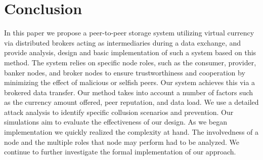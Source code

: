 \documentclass[%
				10pt,
        final,
        notitlepage,
        narroweqnarray,
        inline,
        twoside,
        ]{ieee}
\begin{document}
\section{Conclusion}
In this paper we propose a peer-to-peer storage system utilizing virtual currency via distributed brokers acting as intermediaries during a data exchange, and provide analysis, design and basic implementation of such a system based on this method.  The system relies on specific node roles, such as the consumer, provider, banker nodes, and broker nodes to ensure trustworthiness and cooperation by minimizing the effect of malicious or selfish peers.  Our system achieves this via a brokered data transfer.  Our method takes into account a number of factors such as the currency amount offered, peer reputation, and data load.  We use a detailed attack analysis to identify specific collusion scenarios and prevention.  Our simulations aim to evaluate the effectiveness of our design.  As we began implementation we quickly realized the complexity at hand.  The involvedness of a node and the multiple roles that node may perform had to be analyzed.  We continue to further investigate the formal implementation of our approach.  

\newpage









\end{document}
